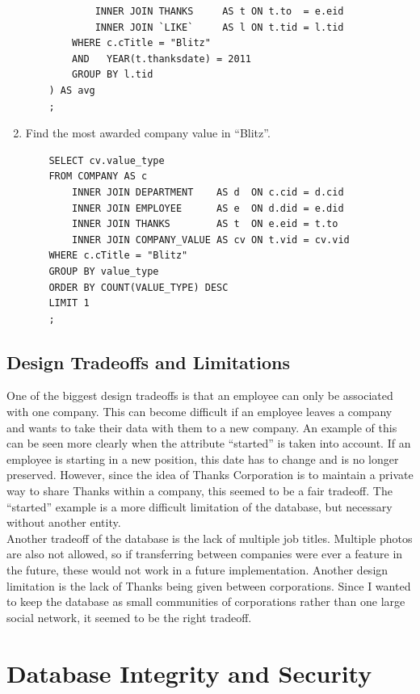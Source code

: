 \documentclass[11pt]{report}
\begin{document}
\begin{enumerate}
\begin{verbatim}
            INNER JOIN THANKS     AS t ON t.to  = e.eid
            INNER JOIN `LIKE`     AS l ON t.tid = l.tid
        WHERE c.cTitle = "Blitz"
        AND   YEAR(t.thanksdate) = 2011
        GROUP BY l.tid
    ) AS avg
    ;
    \end{verbatim}
    \item Find the most awarded company value in ``Blitz''.
    \begin{verbatim}
    SELECT cv.value_type
    FROM COMPANY AS c
        INNER JOIN DEPARTMENT    AS d  ON c.cid = d.cid
        INNER JOIN EMPLOYEE      AS e  ON d.did = e.did
        INNER JOIN THANKS        AS t  ON e.eid = t.to
        INNER JOIN COMPANY_VALUE AS cv ON t.vid = cv.vid
    WHERE c.cTitle = "Blitz"
    GROUP BY value_type
    ORDER BY COUNT(VALUE_TYPE) DESC
    LIMIT 1
    ;
    \end{verbatim}
\end{enumerate}
\section{Design Tradeoffs and Limitations}

One of the biggest design tradeoffs is that an employee can only be associated with one company. This can become difficult if an employee leaves a company and wants to take their data with them to a new company. An example of this can be seen more clearly when the attribute ``started'' is taken into account. If an employee is starting in a new position, this date has to change and is no longer preserved. However, since the idea of Thanks Corporation is to maintain a private way to share Thanks within a company, this seemed to be a fair tradeoff. The ``started'' example is a more difficult limitation of the database, but necessary without another entity. \\

Another tradeoff of the database is the lack of multiple job titles. Multiple photos are also not allowed, so if transferring between companies were ever a feature in the future, these would not work in a future implementation. Another design limitation is the lack of Thanks being given between corporations. Since I wanted to keep the database as small communities of corporations rather than one large social network, it seemed to be the right tradeoff.
\clearpage

\chapter{Database Integrity and Security}
\end{document}
